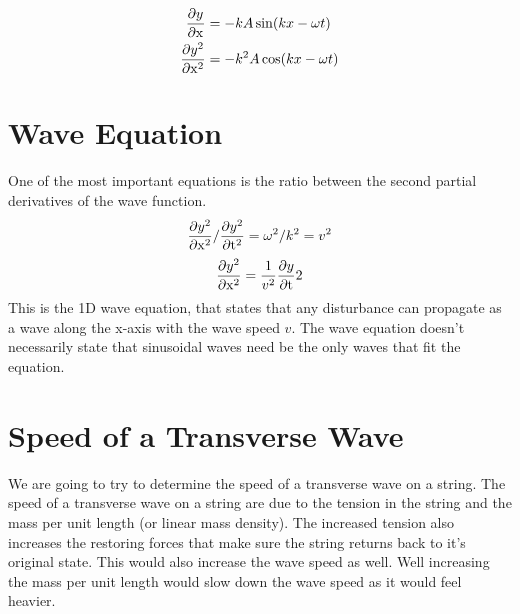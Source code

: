 \begin{align*}
	\frac{\partial y^{}}{\partial\mathrm{x}^{}} &= -kA\sin(kx-\omega t)\\
	\frac{\partial y^{2}}{\partial\mathrm{x}^{2}} &= -k^2A\cos(kx-\omega t) 
\end{align*}

\section{Wave Equation}
One of the most important equations is the ratio between the second partial derivatives of the wave function.
\begin{equation*}
	\frac{\partial y^{2}}{\partial\mathrm{x}^{2}}/\frac{\partial y^{2}}{\partial\mathrm{t}^{2}} = \omega^2/k^2=v^2
\end{equation*}\begin{equation*}
	\frac{\partial y^{2}}{\partial\mathrm{x}^{2}} = \frac{1}{v^2}\frac{\partial y}{\partial\mathrm{t}}{2}
\end{equation*}
This is the 1D wave equation, that states that any disturbance can propagate as a wave along the x-axis with the wave speed $v$. The wave equation doesn't necessarily state that sinusoidal waves need be the only waves that fit the equation.

\newpage
\section{Speed of a Transverse Wave}
We are going to try to determine the speed of a transverse wave on a string. The speed of a transverse wave on a string are due to the tension in the string and the mass per unit length (or linear mass density). The increased tension also increases the restoring forces that make sure the string returns back to it's original state. This would also increase the wave speed as well. Well increasing the mass per unit length would slow down the wave speed as it would feel heavier. 

